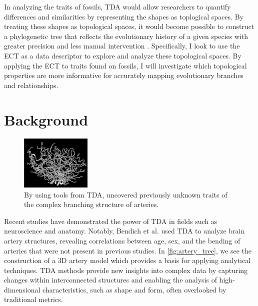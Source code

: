 \documentclass[12pt]{article}
\begin{document}
In analyzing the traits of fossils, TDA would allow researchers to quantify
differences and similarities by representing the shapes as toplogical spaces. By 
treating these shapes as topological spaces, it would become possible to construct a 
phylogenetic tree that reflects the evolutionary history of a given species 
with greater precision and less manual intervention \citep{yang2012}.
Specifically, I look to use the ECT as a data descriptor to explore and analyze
these topological spaces. By applying the ECT to traits found on fossils, I 
will investigate which topological properties are more informative for accurately 
mapping evolutionary branches and relationships. 


\section{Background}
\begin{figure}
	\centering
	\vspace{-12pt}
	\includegraphics[width=0.3\textwidth]{arteryTree.png}
	\caption{By using tools from TDA, \cite{bendich2016} uncovered previously
unknown traits of the complex branching structure of arteries.}
	\label{fig:artery_tree}
\end{figure}
\vspace{-12pt}

Recent studies have demonstrated the power of TDA in fields such as neuroscience
and anatomy. Notably, Bendich et al. \cite{bendich2016} used
TDA to analyze brain artery structures, revealing correlations between age, sex, 
and the bending of arteries that were not present in previous studies. In
\autoref{fig:artery_tree}, we see the construction of a 3D artery model which
provides a basis for applying analytical techniques. TDA methods provide new 
insights into complex data by capturing changes within interconnected 
structures and enabling the analysis of high-dimensional characteristics, 
such as shape and form, often overlooked by traditional metrics. 
\end{document}
